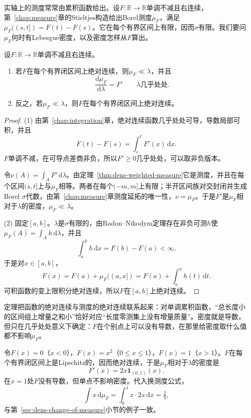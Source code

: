 实轴上的测度常常由累积函数给出。设$F:\mathbb R\to\mathbb R$单调不减且右连续，第~\ref{chap:measure}章的Stieltjes构造给出Borel测度$\mu_F$，满足$\mu_F((s,t])=F(t)-F(s)$。它在每个有界区间上有限，因而$\sigma$有限。我们要问$\mu_F$何时有Lebesgue密度，以及密度怎样从$F$算出。

\begin{theorem}[累积函数的密度]
\label{thm:dens-cumulative}
设$F:\mathbb R\to\mathbb R$单调不减且右连续。
\begin{enumerate}
\item 若$F$在每个有界闭区间上绝对连续，则$\mu_F\ll\lambda$，并且
\begin{equation}
\frac{\mathrm d\mu_F}{\mathrm d\lambda}=F'\qquad\lambda\text{几乎处处}.
\label{eq:dens-cumulative}
\end{equation}
\item 反之，若$\mu_F\ll\lambda$，则$F$在每个有界闭区间上绝对连续。
\end{enumerate}
\end{theorem}

\begin{proof}
(1) 由第~\ref{chap:integration}章，绝对连续函数几乎处处可导，导数局部可积，并且
\[
F(t)-F(s)=\int_s^tF'(x)\,\mathrm dx .
\]
$F$单调不减，在可导点差商非负，所以$F'\geq0$几乎处处，可以取非负版本。

令$\nu(A)=\int_AF'\,\mathrm d\lambda$。由定理~\ref{thm:dens-weighted-measure}它是测度，并且在每个区间$(s,t]$上与$\mu_F$相等。两者在每个$(-m,m]$上有限；半开区间族对交封闭并生成Borel $\sigma$代数，由第~\ref{chap:measure}章测度延拓的唯一性，$\nu=\mu_F$。于是$F'$是$\mu_F$相对于$\lambda$的密度，$\mu_F\ll\lambda$。

(2) 固定$[a,b]$。$\lambda$是$\sigma$有限的，由Radon–Nikodym定理存在非负可测$h$使$\mu_F(A)=\int_Ah\,\mathrm d\lambda$，并且
\[
\int_a^bh\,\mathrm dx=F(b)-F(a)<\infty .
\]
于是对$x\in[a,b]$，
\[
F(x)=F(a)+\mu_F((a,x])=F(a)+\int_a^xh(t)\,\mathrm dt .
\]
可积函数的变上限积分绝对连续，所以$F$在$[a,b]$上绝对连续。
\end{proof}

定理把函数的绝对连续与测度的绝对连续联系起来：对单调累积函数，“总长度小的区间组上增量之和小”恰好对应“长度零测集上没有增量质量”。密度就是导数，但只在几乎处处意义下确定：$F$在个别点上可以没有导数，在那里给密度取什么值都不影响$\mu_F$。

\begin{example}[多项式累积函数]
\label{ex:dens-square-cdf}
令$F(x)=0$（$x<0$），$F(x)=x^2$（$0\leq x\leq1$），$F(x)=1$（$x>1$）。$F$在每个有界闭区间上是Lipschitz的，因而绝对连续，于是$\mu_F$相对于$\lambda$的密度是
\[
F'(x)=2x\mathbf 1_{(0,1)}(x).
\]
在$x=1$处$F$没有导数，但单点不影响密度。代入换测度公式，
\[
\int x\,\mathrm d\mu_F=\int_0^1x\cdot2x\,\mathrm dx=\tfrac23 ,
\]
与第~\ref{sec:dens-change-of-measure}小节的例子一致。
\end{example}

